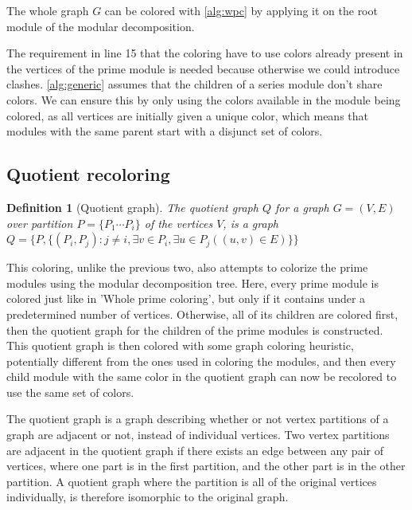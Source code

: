 \documentclass[a4paper]{article}
\newtheorem{definition}{Definition}[section]
\begin{document}
The whole graph $G$ can be colored with \autoref{alg:wpc} by applying it on the
root module of the modular decomposition.

The requirement in line 15 that the coloring have to use colors already present
in the vertices of the prime module is needed because otherwise we could
introduce clashes. \autoref{alg:generic} assumes that the children of a series
module don't share colors. We can ensure this by only using the colors available
in the module being colored, as all vertices are initially given a unique color,
which means that modules with the same parent start with a disjunct set of
colors.

\subsection{Quotient recoloring}

\begin{definition}[Quotient graph]
    The quotient graph $Q$ for a graph $G = (V,E)$ over partition 
    $P = \{P_1 \cdots P_i\}$  of the vertices $V$, is a graph 
    $Q = \{P, \{(P_i,P_j) : j\neq i, \exists v \in P_i,\exists u \in P_j( (u,v)
    \in E)   \} \}  $
\end{definition}

This coloring, unlike the previous two, also attempts to colorize the prime
modules using the modular decomposition tree. Here, every prime module is
colored just like in 'Whole prime coloring', but only if it contains under a
predetermined number of vertices.  Otherwise, all of its children are colored
first, then the quotient graph for the children of the prime modules is
constructed. This quotient graph is then colored with some graph coloring
heuristic, potentially different from the ones used in coloring the modules,
and then every child module with the same color in the quotient graph can now
be recolored to use the same set of colors.

The quotient graph is a graph describing whether or not vertex partitions of a
graph are adjacent or not, instead of individual vertices. Two vertex
partitions are adjacent in the quotient graph if there exists an edge between
any pair of vertices, where one part is in the first partition, and the other
part is in the other partition. A quotient graph where the partition is all of
the original vertices individually, is therefore isomorphic to the original
graph.
\end{document}
